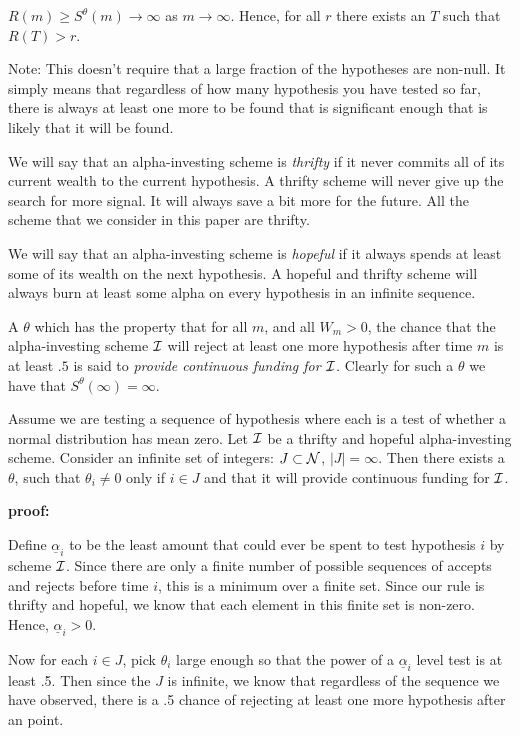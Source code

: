 \documentclass[12pt]{article}
\begin{document}
 $R(m) \ge S^\theta(m) \to \infty$ as $m \to \infty$.  Hence, for all $r$
there exists an $T$ such that $R(T) > r$. \hfill \QED

\noindent
Note: This doesn't require that a large fraction of the hypotheses are
 non-null.  It simply means that regardless of how many hypothesis
 you have tested so far, there is always at least one more to be found
 that is significant enough that is likely that it will be found.

We will say that an alpha-investing scheme is {\em thrifty} if it
 never commits all of its current wealth to the current hypothesis.  A
 thrifty scheme will never give up the search for more signal.  It will
 always save a bit more for the future.  All the scheme that we
 consider in this paper are thrifty.

We will say that an alpha-investing scheme is {\em hopeful} if it
 always spends at least some of its wealth on the next hypothesis.  A
 hopeful and thrifty scheme will always burn at least some alpha on
 every hypothesis in an infinite sequence.

A $\theta$ which has the property that for all $m$, and all $W_m > 0$,
 the chance that the alpha-investing scheme $\cal I$ will reject at
 least one more hypothesis after time $m$ is at least $.5$ is said to
 {\em provide continuous funding for $\cal I$.}  Clearly for such a
 $\theta$ we have that $S^\theta(\infty) = \infty$.

\begin{lemma}
Assume we are testing a sequence of hypothesis where each is a test of
 whether a normal distribution has mean zero.  Let $\cal I$ be a
 thrifty and hopeful alpha-investing scheme.  Consider an infinite set
 of integers: $J \subset \cal N$, $|J| = \infty$.  Then there exists a
 $\theta$, such that $\theta_i \ne 0$ only if $i \in J$ and that it
 will provide continuous funding for $\cal I$.
\end{lemma}

{\bf proof:} 

Define $\underline{\alpha}_i$ to be the least amount that could ever
 be spent to test hypothesis $i$ by scheme $\cal I$.  Since there are
 only a finite number of possible sequences of accepts and rejects
 before time $i$, this is a minimum over a finite set.  Since our rule
 is thrifty and hopeful, we know that each element in this finite set
 is non-zero.  Hence, $\underline{\alpha}_i > 0$.

Now for each $i \in J$, pick $\theta_i$ large enough so that the power
 of a $\underline{\alpha}_i$ level test is at least .5.  Then since
 the $J$ is infinite, we know that regardless of the sequence we have
 observed, there is a .5 chance of rejecting at least one more
 hypothesis after an point. 
\end{document}
